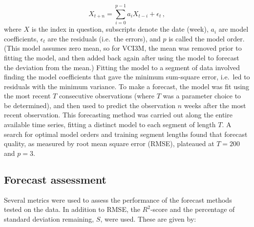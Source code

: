 \documentclass[review]{elsarticle}
\begin{document}
\begin{equation}
X_{t+n}=\sum_{i=0}^{p-1}a_iX_{t-i}+\epsilon_t\,, \label{eq:AR1}
\end{equation}
where $X$ is the index in question, subscripts denote the date (week), $a_i$ are model coefficients, $\epsilon_t$ are the residuals (i.e.~the errors), and $p$ is called the model order. (This model assumes zero mean, so for VCI3M, the mean was removed prior to fitting the model, and then added back again after using the model to forecast the deviation from the mean.) Fitting the model to a segment of data involved finding the model coefficients that gave the minimum sum-square error, i.e.~led to residuals with the minimum variance. To make a forecast, the model was fit using the most recent $T$ consecutive observations (where $T$ was a parameter choice to be determined), and then used to predict the observation $n$ weeks after the most recent observation. This forecasting method was carried out along the entire available time series, fitting a distinct model to each segment of length $T$. A search for optimal model orders and training segment lengths found that forecast quality, as measured by root mean square error (RMSE), plateaued at $T=200$ and $p=3$.%





\subsection{Forecast assessment}
Several metrics were used to assess the performance of the forecast methods tested on the data. In addition to RMSE, the $R^2$-score and the percentage of standard deviation remaining, $S$, were used. These are given by:
\end{document}
